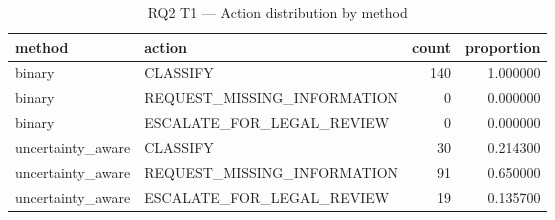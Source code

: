 \begin{table}
\caption{RQ2 T1 — Action distribution by method}
\label{tab:rq2_t1_action_distribution}
\begin{tabular}{llrr}
\toprule
method & action & count & proportion \\
\midrule
binary & CLASSIFY & 140 & 1.000000 \\
binary & REQUEST\_MISSING\_INFORMATION & 0 & 0.000000 \\
binary & ESCALATE\_FOR\_LEGAL\_REVIEW & 0 & 0.000000 \\
uncertainty\_aware & CLASSIFY & 30 & 0.214300 \\
uncertainty\_aware & REQUEST\_MISSING\_INFORMATION & 91 & 0.650000 \\
uncertainty\_aware & ESCALATE\_FOR\_LEGAL\_REVIEW & 19 & 0.135700 \\
\bottomrule
\end{tabular}
\end{table}
